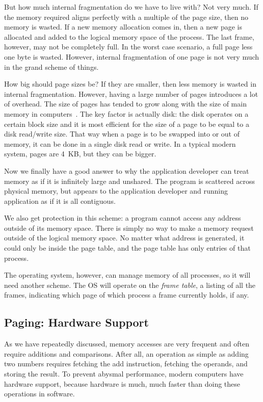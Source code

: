 But how much internal fragmentation do we have to live with? Not very much. If the memory required aligns perfectly with a multiple of the page size, then no memory is wasted. If a new memory allocation comes in, then a new page is allocated and added to the logical memory space of the process. The last frame, however, may not be completely full. In the worst case scenario, a full page less one byte is wasted. However, internal fragmentation of one page is not very much in the grand scheme of things.

How big should page sizes be? If they are smaller, then less memory is wasted in internal fragmentation. However, having a large number of pages introduces a lot of overhead. The size of pages has tended to grow along with the size of main memory in computers~\cite{osc}. The key factor is actually disk: the disk operates on a certain block size and it is most efficient for the size of a page to be equal to a disk read/write size. That way when a page is to be swapped into or out of memory, it can be done in a single disk read or write. In a typical modern system, pages are 4~KB, but they can be bigger.

Now we finally have a good answer to why the application developer can treat memory as if it is infinitely large and unshared. The program is scattered across physical memory, but appears to the application developer and running application as if it is all contiguous. 

We also get protection in this scheme: a program cannot access any address outside of its memory space. There is simply no way to make a memory request outside of the logical memory space. No matter what address is generated, it could only be inside the page table, and the page table has only entries of that process.

The operating system, however, can manage memory of all processes, so it will need another scheme. The OS will operate on the \textit{frame table}, a listing of all the frames, indicating which page of which process a frame currently holds, if any.

\subsection*{Paging: Hardware Support}
As we have repeatedly discussed, memory accesses are very frequent and often require additions and comparisons. After all, an operation as simple as adding two numbers requires fetching the add instruction, fetching the operands, and storing the result. To prevent abysmal performance, modern computers have hardware support, because hardware is much, much faster than doing these operations in software.

